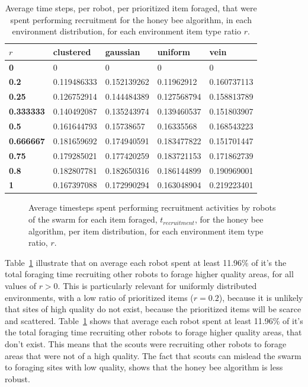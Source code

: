 \begin{table}[]
\centering
\caption{Average time steps, per robot, per prioritized item foraged, that were spent performing recruitment for the honey bee algorithm, in each environment distribution, for each environment item type ratio $r$.}
\label{averagetimerecruitment}
\begin{tabular}{@{}lllll@{}}
\toprule
$r$            & \textbf{clustered} & \textbf{gaussian} & \textbf{uniform} & \textbf{vein} \\ \midrule
\textbf{0}        & 0        & 0       & 0      & 0   \\
\textbf{0.2}      & 0.119486333        & 0.152139262       & 0.11962912       & 0.160737113   \\
\textbf{0.25}     & 0.126752914        & 0.144484389       & 0.127568794      & 0.158813789   \\
\textbf{0.333333} & 0.140492087        & 0.135243974       & 0.139460537      & 0.151803907   \\
\textbf{0.5}      & 0.161644793        & 0.15738657        & 0.16335568       & 0.168543223   \\
\textbf{0.666667} & 0.181659692        & 0.174940591       & 0.183477822      & 0.151701447   \\
\textbf{0.75}     & 0.179285021        & 0.177420259       & 0.183721153      & 0.171862739   \\
\textbf{0.8}      & 0.182807781        & 0.182650316       & 0.186144899      & 0.190969001   \\
\textbf{1}        & 0.167397088        & 0.172990294       & 0.163048904      & 0.219223401   \\ \bottomrule
\end{tabular}
\end{table}


\begin{figure}[!htb]
\centering
\resizebox{\textwidth}{!}{}
\caption{Average timesteps spent performing recruitment activities by robots of the swarm for each item foraged, $t_{recruitment}$, for the honey bee algorithm, per item distribution, for each environment item type ratio, $r$.}
\label{fig:recruitmenttime}
\end{figure}

Table~\ref{averagetimerecruitment} illustrate that on average each robot spent at least 11.96\% of it's the total foraging time recruiting other robots to forage higher quality areas, for all values of $r > 0$. This is particularly relevant for uniformly distributed environments, with a low ratio of prioritized items ($r = 0.2$), because it is unlikely that sites of high quality do not exist, because the prioritized items will be scarce and scattered. Table~\ref{averagetimerecruitment} shows that average each robot spent at least 11.96\% of it's the total foraging time recruiting other robots to forage higher quality areas, that don't exist. This means that the scouts were recruiting other robots to forage areas that were not of a high quality. The fact that scouts can mislead the swarm to foraging sites with low quality, shows that the honey bee algorithm is less robust.

